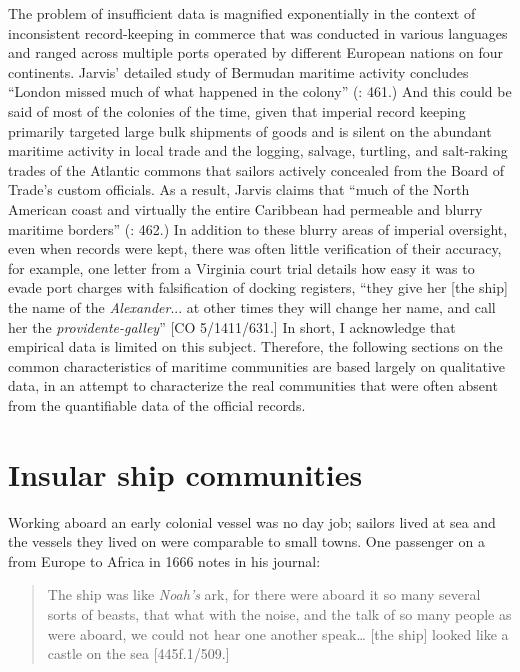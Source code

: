 The problem of insufficient data is magnified exponentially in the context of inconsistent record-keeping in  commerce that was conducted in various languages and ranged across multiple ports operated by different European nations on four continents. Jarvis’ detailed study of Bermudan maritime activity concludes “London missed much of what happened in the colony” (\citealt{Jarvis2010}: 461.) And this could be said of most of the colonies of the time, given that imperial record keeping primarily targeted large bulk shipments of goods and is silent on the abundant maritime activity in local trade and the logging, salvage, turtling, and salt-raking trades of the Atlantic commons that sailors actively concealed from the Board of Trade’s custom officials. As a result, Jarvis claims that “much of the North American coast and virtually the entire Caribbean had permeable and blurry maritime borders” (\citealt{Jarvis2010}: 462.) In addition to these blurry areas of imperial oversight, even when records were kept, there was often little verification of their accuracy, for example, one letter from a Virginia court trial details how easy it was to evade port charges with falsification of docking registers, “they give her [the ship] the name of the \textit{Alexander}... at other times they will change her name, and call her the \textit{providente-galley}” [CO 5/1411/631.] In short, I acknowledge that empirical data is limited on this subject.  Therefore, the following sections on the common characteristics of maritime communities are based largely on qualitative data, in an attempt to characterize the real communities that were often absent from the quantifiable data of the official records.

\section{{Insular ship communities}}%

Working aboard an early colonial vessel was no day job; sailors lived at sea and the vessels they lived on were comparable to small towns. One passenger on a  from Europe to Africa in 1666 notes in his journal: 

\begin{quotation}
The ship was like \textit{Noah’s} ark, for there were aboard it so many several sorts of beasts, that what with the noise, and the talk of so many people as were aboard, we could not hear one another speak… [the ship] looked like a castle on the sea [445f.1/509.]
\end{quotation}

